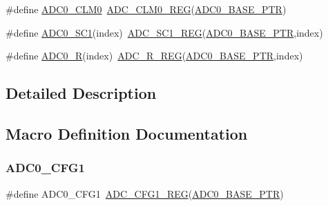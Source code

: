 \begin{DoxyCompactItemize}
\item 
\#define \hyperlink{group___a_d_c___register___accessor___macros_ga5dca3dc10fac37b7fc668a9664da1607}{A\+D\+C0\+\_\+\+C\+L\+M0}~\hyperlink{group___a_d_c___register___accessor___macros_ga9ee18d17721b33728716bab21e035534}{A\+D\+C\+\_\+\+C\+L\+M0\+\_\+\+R\+EG}(\hyperlink{group___a_d_c___peripheral_ga6cec2f227a3a37a9fccaa830740f1f5e}{A\+D\+C0\+\_\+\+B\+A\+S\+E\+\_\+\+P\+TR})
\item 
\#define \hyperlink{group___a_d_c___register___accessor___macros_ga74e1388b9008043dfffab26709577f14}{A\+D\+C0\+\_\+\+S\+C1}(index)~\hyperlink{group___a_d_c___register___accessor___macros_ga1b28fcb3112387441ecc5fe9251a32e9}{A\+D\+C\+\_\+\+S\+C1\+\_\+\+R\+EG}(\hyperlink{group___a_d_c___peripheral_ga6cec2f227a3a37a9fccaa830740f1f5e}{A\+D\+C0\+\_\+\+B\+A\+S\+E\+\_\+\+P\+TR},index)
\item 
\#define \hyperlink{group___a_d_c___register___accessor___macros_ga6e68bb0b85f28213a274b53aa8ddfc36}{A\+D\+C0\+\_\+R}(index)~\hyperlink{group___a_d_c___register___accessor___macros_gaecd126e0e0812785b36331de88019dde}{A\+D\+C\+\_\+\+R\+\_\+\+R\+EG}(\hyperlink{group___a_d_c___peripheral_ga6cec2f227a3a37a9fccaa830740f1f5e}{A\+D\+C0\+\_\+\+B\+A\+S\+E\+\_\+\+P\+TR},index)
\end{DoxyCompactItemize}


\subsection{Detailed Description}


\subsection{Macro Definition Documentation}
\mbox{\label{group___a_d_c___register___accessor___macros_ga74e7b7426570c776cdb8a83a9a20c654}} 
\subsubsection{\texorpdfstring{A\+D\+C0\+\_\+\+C\+F\+G1}{ADC0\_CFG1}}
{\footnotesize\ttfamily \#define A\+D\+C0\+\_\+\+C\+F\+G1~\hyperlink{group___a_d_c___register___accessor___macros_gaa64d6563b96bb9c13693c466528decd7}{A\+D\+C\+\_\+\+C\+F\+G1\+\_\+\+R\+EG}(\hyperlink{group___a_d_c___peripheral_ga6cec2f227a3a37a9fccaa830740f1f5e}{A\+D\+C0\+\_\+\+B\+A\+S\+E\+\_\+\+P\+TR})}

